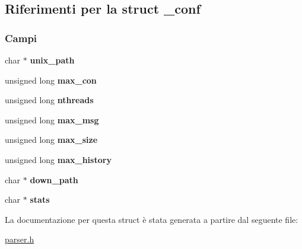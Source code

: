 \hypertarget{struct__conf}{}\subsection{Riferimenti per la struct \+\_\+conf}
\label{struct__conf}
\subsubsection*{Campi}
\begin{DoxyCompactItemize}
\item 
\mbox{\label{struct__conf_a708ff2a48b2f70755343436f816246d2}} 
char $\ast$ {\bfseries unix\+\_\+path}
\item 
\mbox{\label{struct__conf_afe49222f58123e9d68d9d5c57f8c027b}} 
unsigned long {\bfseries max\+\_\+con}
\item 
\mbox{\label{struct__conf_a0b2522a31438a203759788379131aca2}} 
unsigned long {\bfseries nthreads}
\item 
\mbox{\label{struct__conf_ab9fd62b52196aa4fd64f9e05c5f18dba}} 
unsigned long {\bfseries max\+\_\+msg}
\item 
\mbox{\label{struct__conf_a2613f904e25891b22a8b303c6bba04e0}} 
unsigned long {\bfseries max\+\_\+size}
\item 
\mbox{\label{struct__conf_a450e052b1644fa6f8e985713e96b6cc1}} 
unsigned long {\bfseries max\+\_\+history}
\item 
\mbox{\label{struct__conf_a270b42142895de4e37cc43a9555fcaa6}} 
char $\ast$ {\bfseries down\+\_\+path}
\item 
\mbox{\label{struct__conf_a2cd910d2471f426809b997d0b032a75d}} 
char $\ast$ {\bfseries stats}
\end{DoxyCompactItemize}


La documentazione per questa struct è stata generata a partire dal seguente file\+:\begin{DoxyCompactItemize}
\item 
\mbox{\hyperlink{parser_8h}{parser.\+h}}\end{DoxyCompactItemize}
